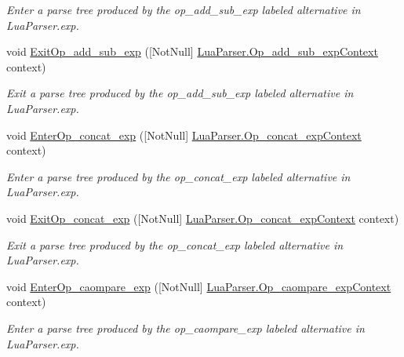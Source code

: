 \begin{DoxyCompactItemize}
\begin{DoxyCompactList}\small\item\em Enter a parse tree produced by the {\ttfamily op\+\_\+add\+\_\+sub\+\_\+exp} labeled alternative in Lua\+Parser.\+exp. \end{DoxyCompactList}\item 
void \mbox{\hyperlink{interfacezlua_1_1_i_lua_listener_a51e9a33e0c604e3a6151becd926a5852}{Exit\+Op\+\_\+add\+\_\+sub\+\_\+exp}} (\mbox{[}Not\+Null\mbox{]} \mbox{\hyperlink{classzlua_1_1_lua_parser_1_1_op__add__sub__exp_context}{Lua\+Parser.\+Op\+\_\+add\+\_\+sub\+\_\+exp\+Context}} context)
\begin{DoxyCompactList}\small\item\em Exit a parse tree produced by the {\ttfamily op\+\_\+add\+\_\+sub\+\_\+exp} labeled alternative in Lua\+Parser.\+exp. \end{DoxyCompactList}\item 
void \mbox{\hyperlink{interfacezlua_1_1_i_lua_listener_acbbb173b8111f78841067f364c764c2c}{Enter\+Op\+\_\+concat\+\_\+exp}} (\mbox{[}Not\+Null\mbox{]} \mbox{\hyperlink{classzlua_1_1_lua_parser_1_1_op__concat__exp_context}{Lua\+Parser.\+Op\+\_\+concat\+\_\+exp\+Context}} context)
\begin{DoxyCompactList}\small\item\em Enter a parse tree produced by the {\ttfamily op\+\_\+concat\+\_\+exp} labeled alternative in Lua\+Parser.\+exp. \end{DoxyCompactList}\item 
void \mbox{\hyperlink{interfacezlua_1_1_i_lua_listener_a5d79067d1b0d73aee302cf12972c0d4f}{Exit\+Op\+\_\+concat\+\_\+exp}} (\mbox{[}Not\+Null\mbox{]} \mbox{\hyperlink{classzlua_1_1_lua_parser_1_1_op__concat__exp_context}{Lua\+Parser.\+Op\+\_\+concat\+\_\+exp\+Context}} context)
\begin{DoxyCompactList}\small\item\em Exit a parse tree produced by the {\ttfamily op\+\_\+concat\+\_\+exp} labeled alternative in Lua\+Parser.\+exp. \end{DoxyCompactList}\item 
void \mbox{\hyperlink{interfacezlua_1_1_i_lua_listener_a15745713dc5965a0337698761f16947d}{Enter\+Op\+\_\+caompare\+\_\+exp}} (\mbox{[}Not\+Null\mbox{]} \mbox{\hyperlink{classzlua_1_1_lua_parser_1_1_op__caompare__exp_context}{Lua\+Parser.\+Op\+\_\+caompare\+\_\+exp\+Context}} context)
\begin{DoxyCompactList}\small\item\em Enter a parse tree produced by the {\ttfamily op\+\_\+caompare\+\_\+exp} labeled alternative in Lua\+Parser.\+exp. \end{DoxyCompactList}\item 

\end{DoxyCompactItemize}
